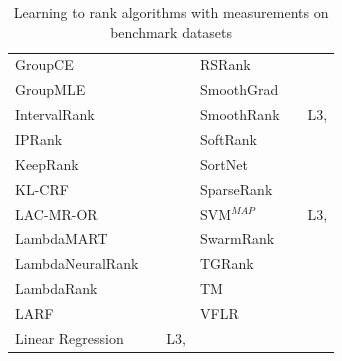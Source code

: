 \documentclass[english, authoryear, preprint]{elsarticle}
\begin{document}
\begin{table}[!hpt]
{\begin{tabular}{lll|lll}
GroupCE & \cite{Lin2011} & \cite{Lin2011} & RSRank & \cite{Sun2009} & \cite{Lai2013} \\ 
GroupMLE & \cite{Lin2010} & \cite{Lin2011} & SmoothGrad & \cite{Le2007} & \cite{Tan2013} \\ 
IntervalRank & \cite{Moon2010} & \cite{Moon2010, Freno2011} & SmoothRank & \cite{Chapelle2010} & L3, \cite{Chapelle2010} \\
IPRank & \cite{Wang2009b} & \cite{Wang2009b, Torkestani2012} & SoftRank & \cite{Taylor2008, Guiver2008} & \cite{Qin2010b} \\ 
KeepRank & \cite{Chen2009} & \cite{Chen2009} & SortNet & \cite{Rigutini2008} & \cite{Rigutini2008,Freno2011, Papini2012} \\
KL-CRF & \cite{Volkovs2011} & \cite{Volkovs2011} & SparseRank & \cite{Lai2013b} & \cite{Lai2013b} \\ 
LAC-MR-OR & \cite{Veloso2008} & \cite{Veloso2008, Alcantara2010} & SVM$^{MAP}$ & \cite{Yue2007} & L3, \cite{Wang2012, Xu2008, Niu2012} \\ 
LambdaMART & \cite{Burges2010} & \cite{Asadi2013a, Ganjisaffar2011c} &SwarmRank & \cite{Diaz-Aviles2009} & \cite{Sato2013} \\ 
LambdaNeuralRank & \cite{Papini2012} & \cite{Papini2012} & TGRank & \cite{Lai2013} & \cite{Lai2013} \\ 
LambdaRank & \cite{Burges2006} & \cite{Papini2012, Tan2013} & TM & \cite{Zhou2008} & \cite{Zhou2008, Papini2012, Tan2013} \\ 
LARF & \cite{Torkestani2012} & \cite{Torkestani2012} &  VFLR & \cite{Cai2012} & \cite{Cai2012} \\
Linear Regression & \cite{Cossock2006} & L3, \cite{Wang2012, Volkovs2011} & & & \\
\bottomrule
\end{tabular}
\caption{Learning to rank algorithms with measurements on benchmark datasets}}
\label{tab:ltr_methods_used}
\end{table}
\end{document}
